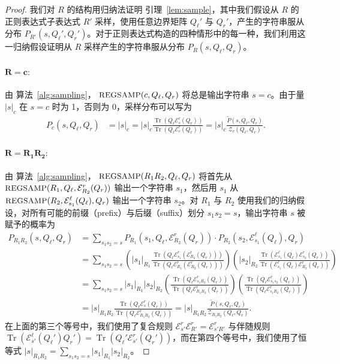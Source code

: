 \documentclass[twoside]{article}
\newcommand{\Sample}{\textsc{\small REGSAMP}}
\DeclareMathOperator{\Tr}{Tr}
\newcommand{\EL}{\mc{E}^{\scriptstyle \ell}}
\newcommand{\ER}{\mc{E}^{\scriptstyle r}}
\newcommand{\QL}{Q_{\ell}}
\newcommand{\QR}{Q_{r}}
\newcommand{\sRone}{|s_1|_{R_1}}
\newcommand{\sRtwo}{|s_2|_{R_2}}
\newcommand{\Pt}{\tilde{P}}
\newcommand{\mc}[1]{\mathcal{#1}}
\begin{document}
\begin{proof}

我们对 $R$ 的结构用归纳法证明 引理~\ref{lem:sample}，其中我们假设从 $R$ 的正则表达式子表达式 $R'$ 采样，使用任意边界矩阵 $\QL'$ 与 $\QR'$，产生的字符串服从分布 $P_{R'}(s, \QL', \QR')$。对于正则表达式构造的四种情形中的每一种，我们利用这一归纳假设证明从 $R$ 采样产生的字符串服从分布 $P_R(s, \QL, \QR)$。

\paragraph{$\mathbf{R = c:}$} 由 算法~\ref{alg:sampling}，
$\Sample(c, \QL, \QR)$ 将总是输出字符串 $s = c$。由于量 $|s|_c$ 在 $s = c$ 时为 1，否则为 0，采样分布可以写为
%
\begin{align*}
    P_c(s, \QL, \QR) &= |s|_c = |s|_c \frac{\Tr(\QL \ER_s(\QR))}{\Tr(\QL \ER_c(\QR))} = |s|_c \frac{\Pt(s, \QL, \QR)}{\mc{Z}_c(\QL, \QR)}.
\end{align*}

\paragraph{$\mathbf{R = R_1 R_2:}$} 由 算法~\ref{alg:sampling}，
$\Sample(R_1 R_2, \QL, \QR)$ 将首先从 $\Sample(R_1, \QL, \ER_{R_2}(\QR))$ 输出一个字符串 $s_1$，然后用 $s_1$ 从 $\Sample(R_2, \EL_{s_1}(\QL), \QR)$ 输出一个字符串 $s_2$。对 $R_1$ 与 $R_2$ 使用我们的归纳假设，对所有可能的前缀（prefix）与后缀（suffix）划分 $s_1 s_2 = s$，输出字符串 $s$ 被赋予的概率为
%
\begin{align*}
    P_{R_1 R_2}(s, \QL, \QR) &= \sum_{s_1 s_2 = s} P_{R_1}(s_1, \QL, \ER_{R_2}(\QR)) \cdot P_{R_2}(s_2, \EL_{s_1}(\QL), \QR) \\
    &= \sum_{s_1 s_2 = s} \left( \sRone \frac{\Tr(\QL \ER_{s_1}(\ER_{R_2}(\QR)))}{\Tr(\QL \ER_{R_1}(\ER_{R_2}(\QR)))} \right) \left( \sRtwo \frac{\Tr(\EL_{s_1}(\QL) \ER_{s_2}(\QR))}{\Tr(\EL_{s_1}(\QL) \ER_{R_2}(\QR))} \right) \\
    &= \sum_{s_1 s_2 = s} \sRone \sRtwo \left(\frac{\Tr(\QL \ER_{s_1 R_2}(\QR))}{\Tr(\QL \ER_{R_1 R_2}(\QR))}\right) \left(\frac{\Tr(\QL \ER_{s_1 s_2}(\QR))}{\Tr(\QL \ER_{s_1 R_2}(\QR))}\right) \\
    &= |s|_{R_1 R_2} \frac{\Tr(\QL \ER_{s}(\QR))}{\Tr(\QL \ER_{R_1 R_2}(\QR))} = |s|_{R_1 R_2} \frac{\Pt(s, \QL, \QR)}{\mc{Z}_{R_1 R_2}(\QL, \QR)}.
\end{align*}
%
在上面的第三个等号中，我们使用了复合规则 $\ER_{s'}\ER_{R'} = \ER_{s' R'}$ 与伴随规则 $\Tr(\EL_{s'}(\QL') \QR') = \Tr(\QL' \ER_{s'}(\QR'))$，而在第四个等号中，我们使用了恒等式 $|s|_{R_1 R_2} = \sum_{s_1 s_2 = s} |s_1|_{R_1} |s_2|_{R_2}$。


\end{proof}
\end{document}
